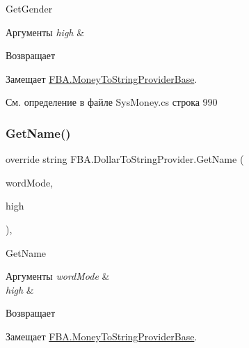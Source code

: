 Get\+Gender 


\begin{DoxyParams}{Аргументы}
{\em high} & \\
\hline
\end{DoxyParams}
\begin{DoxyReturn}{Возвращает}

\end{DoxyReturn}


Замещает \mbox{\hyperlink{class_f_b_a_1_1_money_to_string_provider_base_a24e1e1dcd1a4c42773d3ec0034a4ca6d}{F\+B\+A.\+Money\+To\+String\+Provider\+Base}}.



См. определение в файле Sys\+Money.\+cs строка 990

\mbox{\label{class_f_b_a_1_1_dollar_to_string_provider_aa76306e1936425f5c39e70ccdd79ba7a}} 
\subsubsection{\texorpdfstring{Get\+Name()}{GetName()}}
{\footnotesize\ttfamily override string F\+B\+A.\+Dollar\+To\+String\+Provider.\+Get\+Name (\begin{DoxyParamCaption}\item[{Number\+To\+Russian\+String.\+Word\+Mode}]{word\+Mode,  }\item[{bool}]{high }\end{DoxyParamCaption})\hspace{0.3cm}{\ttfamily [protected]}, {\ttfamily [virtual]}}



Get\+Name 


\begin{DoxyParams}{Аргументы}
{\em word\+Mode} & \\
\hline
{\em high} & \\
\hline
\end{DoxyParams}
\begin{DoxyReturn}{Возвращает}

\end{DoxyReturn}


Замещает \mbox{\hyperlink{class_f_b_a_1_1_money_to_string_provider_base_aea712eaf4a5d84eed5624e3d48988502}{F\+B\+A.\+Money\+To\+String\+Provider\+Base}}.



